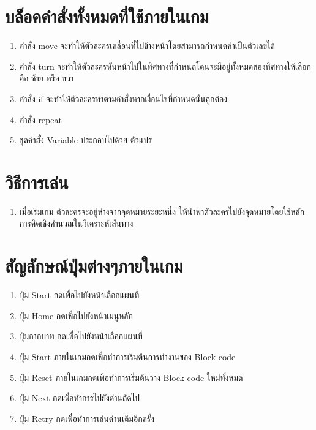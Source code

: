 \section{บล็อคคำสั่งทั้งหมดที่ใช้ภายในเกม}
\begin{enumerate}
    \item คำสั่ง move จะทำให้ตัวละครเคลื่อนที่ไปข้างหน้าโดยสามารถกำหนดค่าเป็นตัวเลขได้
    \item คำสั่ง turn จะทำให้ตัวละครหันหน้าไปในทิศทางที่กำหนดโดนจะมีอยู่ทั้งหมดสองทิศทางให้เลือกคือ ซ้าย หรือ ขวา
    \item คำสั่ง if จะทำให้ตัวละครทำตามคำสั่งหากเงื่อนไขที่กำหนดนั้นถูกต้อง
    \item คำสั่ง repeat
    \item ชุดคำสั่ง Variable ประกอบไปด้วย ตัวแปร 
    
\end{enumerate}

\section{วิธีการเล่น}
\begin{enumerate}
    \item เมื่อเริ่มเกม ตัวละครจะอยู่ห่างจากจุดหมายระยะหนึ่ง ให้นำพาตัวละครไปยังจุดหมายโดยใช้หลักการคิดเชิงคำนวณในวิเคราะห์เส้นทาง 
    
\end{enumerate}

\section{สัญลักษณ์ปุ่มต่างๆภายในเกม}
\begin{enumerate}
    \item ปุ่ม Start กดเพื่อไปยังหน้าเลือกแผนที่
    \item ปุ่ม Home กดเพื่อไปยังหน้าเมนูหลัก
    \item ปุ่มกากบาท กดเพื่อไปยังหน้าเลือกแผนที่
    \item ปุ่ม Start ภายในเกมกดเพื่อทำการเริ่มต้นการทำงานของ Block code
    \item ปุ่ม Reset ภายในเกมกดเพื่อทำการเริ่มต้นวาง Block code ใหม่ทั้งหมด
    \item ปุ่ม Next กดเพื่อทำการไปยังด่านถัดไป
    \item ปุ่ม  Retry กดเพื่อทำการเล่นด่านเดิมอีกครั้ง
    
\end{enumerate}

